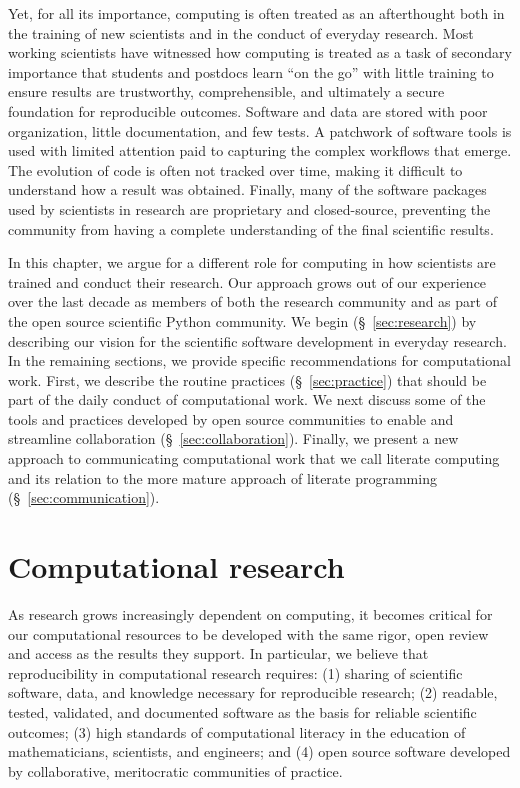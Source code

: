 \documentclass[ChapterTOCs,krantz2]{krantz} %
\begin{document}
Yet, for all its importance, computing is often treated as an afterthought both
in the training of new scientists and in the conduct of everyday research. Most
working scientists have witnessed how computing is treated as a task of
secondary importance that students and postdocs learn ``on the go'' with little
training to ensure results are trustworthy, comprehensible, and ultimately a
secure foundation for reproducible outcomes.  Software and data are stored with
poor organization, little documentation, and few tests.  A patchwork of
software tools is used with limited attention paid to capturing the complex
workflows that emerge.  The evolution of code is often not tracked over time,
making it difficult to understand how a result was obtained. Finally, many of
the software packages used by scientists in research are proprietary and
closed-source, preventing the community from having a complete understanding of
the final scientific results.

In this chapter, we argue for a different role for computing in how
scientists are trained and conduct their research. Our approach grows out
of our experience over the last decade as members of both the research
community and as part of the open source scientific Python community.  We begin
(§~\ref{sec:research}) by describing our vision for the scientific
software development in everyday research. In the remaining sections,
we provide specific recommendations for computational work. First,
we describe the routine practices (§~\ref{sec:practice}) that should be
part of the daily conduct of computational work. We next discuss some of
the tools and practices developed by open source communities to enable
and streamline collaboration (§~\ref{sec:collaboration}). Finally,
we present a new approach to communicating computational work that we call
literate computing and its relation to the more mature approach of literate
programming (§~\ref{sec:communication}).

\section{\label{sec:research}Computational research}

As research grows increasingly dependent on computing, it becomes critical for
our computational resources to be developed with the same rigor, open review
and access as the results they support. In particular, we believe that
reproducibility in computational research requires: (1) sharing of scientific
software, data, and knowledge necessary for reproducible research; (2)
readable, tested, validated, and documented software as the basis for reliable
scientific outcomes; (3) high standards of computational literacy in the
education of mathematicians, scientists, and engineers; and (4) open source
software developed by collaborative, meritocratic communities of practice.
\end{document}
